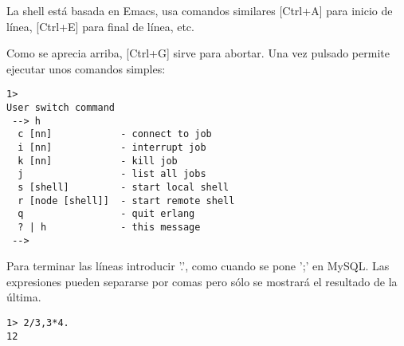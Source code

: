 La shell está basada en Emacs, usa comandos similares [Ctrl+A] para inicio de línea, [Ctrl+E] para final de
línea, etc.


Como se aprecia arriba, [Ctrl+G] sirve para abortar. Una vez pulsado permite ejecutar unos comandos simples:


\begin{lstlisting}
1>
User switch command
 --> h
  c [nn]            - connect to job
  i [nn]            - interrupt job
  k [nn]            - kill job
  j                 - list all jobs
  s [shell]         - start local shell
  r [node [shell]]  - start remote shell
  q                 - quit erlang
  ? | h             - this message
 -->
\end{lstlisting}

Para terminar las líneas introducir '.', como cuando se pone ';' en MySQL. Las expresiones pueden separarse
por comas pero sólo se mostrará el resultado de la última.

\begin{lstlisting}
1> 2/3,3*4.
12
\end{lstlisting}

